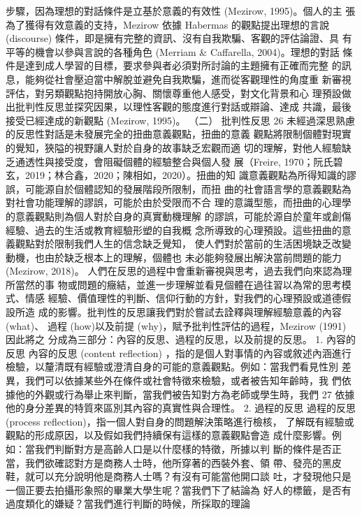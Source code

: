 步驟，因為理想的對話條件是立基於意義的有效性 (Mezirow, 1995)。個人的主
張為了獲得有效意義的支持，Mezirow 依據 Habermas 的觀點提出理想的言說 
(discourse) 條件，即是擁有完整的資訊、沒有自我欺騙、客觀的評估論證、具
有平等的機會以參與言說的各種角色 (Merriam & Caffarella, 2004)。理想的對話
條件是達到成人學習的目標，要求參與者必須對所討論的主題擁有正確而完整
的訊息，能夠從社會壓迫當中解脫並避免自我欺騙，進而從客觀理性的角度重
新審視評估，對另類觀點抱持開放心胸、關懷尊重他人感受，對文化背景和心
理預設做出批判性反思並探究因果，以理性客觀的態度進行對話或辯論、達成
共識，最後接受已經達成的新觀點 (Mezirow, 1995)。 
（二） 批判性反思 
26 
未經過深思熟慮的反思性對話是未發展完全的扭曲意義觀點，扭曲的意義
觀點將限制個體對現實的覺知，狹隘的視野讓人對於自身的故事缺乏宏觀而適
切的理解，對他人經驗缺乏通透性與接受度，會阻礙個體的經驗整合與個人發
展（Freire, 1970；阮氏碧玄，2019；林合鑫，2020；陳相如，2020）。扭曲的知
識意義觀點為所得知識的謬誤，可能源自於個體認知的發展階段所限制，而扭
曲的社會語言學的意義觀點為對社會功能理解的謬誤，可能於由於受限而不合
理的意識型態，而扭曲的心理學的意義觀點則為個人對於自身的真實動機理解
的謬誤，可能於源自於童年或創傷經驗、過去的生活或教育經驗形塑的自我概
念所導致的心理預設。這些扭曲的意義觀點對於限制我們人生的信念缺乏覺知，
使人們對於當前的生活困境缺乏改變動機，也由於缺乏根本上的理解，個體也
未必能夠發展出解決當前問題的能力 (Mezirow, 2018)。 
人們在反思的過程中會重新審視與思考，過去我們向來認為理所當然的事
物或問題的癥結，並進一步理解並看見個體在過往習以為常的思考模式、情感
經驗、價值理性的判斷、信仰行動的方針，對我們的心理預設或道德假設所造
成的影響。批判性的反思讓我們對於嘗試去詮釋與理解經驗意義的內容 (what)、
過程 (how)以及前提 (why)，賦予批判性評估的過程，Mezirow (1991) 因此將之
分成為三部分：內容的反思、過程的反思，以及前提的反思。 
1. 內容的反思 
內容的反思 (content reflection) ，指的是個人對事情的內容或敘述內涵進行
檢驗，以釐清既有經驗或澄清自身的可能的意義觀點。例如：當我們看見性別
差異，我們可以依據某些外在條件或社會特徵來檢驗，或者被告知年齡時，我
們依據他的外觀或行為舉止來判斷，當我們被告知對方為老師或學生時，我們
27 
依據他的身分差異的特質來區別其內容的真實性與合理性。 
2. 過程的反思 
過程的反思 (process reflection)，指一個人對自身的問題解決策略進行檢核，
了解既有經驗或觀點的形成原因，以及假如我們持續保有這樣的意義觀點會造
成什麼影響。例如：當我們判斷對方是高齡人口是以什麼樣的特徵，所據以判
斷的條件是否正當，我們欲確認對方是商務人士時，他所穿著的西裝外套、領
帶、發亮的黑皮鞋，就可以充分說明他是商務人士嗎？有沒有可能當他開口談
吐，才發現他只是一個正要去拍攝形象照的畢業大學生呢？當我們下了結論為
好人的標籤，是否有過度類化的嫌疑？當我們進行判斷的時候，所採取的理論
